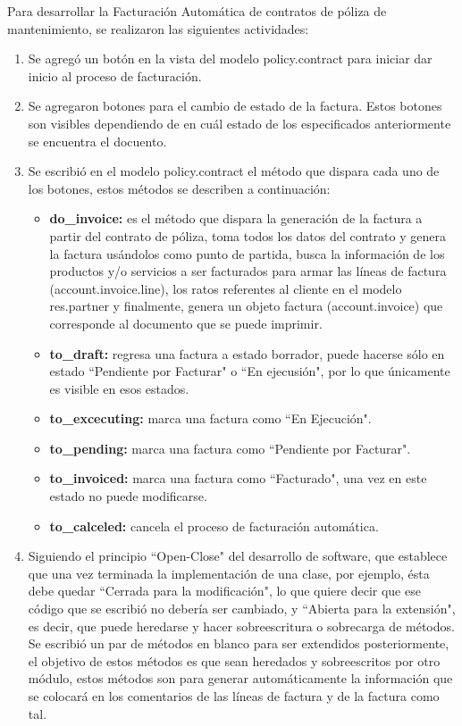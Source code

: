 \documentclass[a4paper, 12pt]{article}
\begin{document}
Para desarrollar la Facturación Automática de contratos de póliza de mantenimiento, se realizaron las siguientes actividades:
\begin{enumerate}
    \item Se agregó un botón en la vista del modelo policy.contract para iniciar dar inicio al proceso de facturación.
    \item Se agregaron botones para el cambio de estado de la factura. Estos botones son visibles dependiendo de en cuál estado de los especificados anteriormente se encuentra el docuento.
    \item Se escribió en el modelo policy.contract el método que dispara cada uno de los botones, estos métodos se describen a continuación:
    \begin{itemize}
        \item \textbf{do\_invoice:} es el método que dispara la generación de la factura a partir del contrato de póliza, toma todos los datos del contrato y genera la factura usándolos como punto de partida, busca la información de los productos y/o servicios a ser facturados para armar las líneas de factura (account.invoice.line), los ratos referentes al cliente en el modelo res.partner y finalmente, genera un objeto factura (account.invoice) que corresponde al documento que se puede imprimir.
        \item \textbf{to\_draft:} regresa una factura a estado borrador, puede hacerse sólo en estado ``Pendiente por Facturar" o ``En ejecusión", por lo que únicamente es visible en esos estados.
        \item \textbf{to\_excecuting:} marca una factura como ``En Ejecución".
        \item \textbf{to\_pending:} marca una factura como ``Pendiente por Facturar".
        \item \textbf{to\_invoiced:} marca una factura como ``Facturado", una vez en este estado no puede modificarse.
        \item \textbf{to\_calceled:} cancela el proceso de facturación automática.
    \end{itemize}
    \item Siguiendo el principio ``Open-Close" del desarrollo de software, que establece que una vez terminada la implementación de una clase, por ejemplo, ésta debe quedar ``Cerrada para la modificación", lo que quiere decir que ese código que se escribió no debería ser cambiado, y ``Abierta para la extensión", es decir, que puede heredarse y hacer sobreescritura o sobrecarga de métodos. Se escribió un par de métodos en blanco para ser extendidos posteriormente, el objetivo de estos métodos es que sean heredados y sobreescritos por otro módulo, estos métodos son para generar automáticamente la información que se colocará en los comentarios de las líneas de factura y de la factura como tal. 
\end{enumerate}
\end{document}
